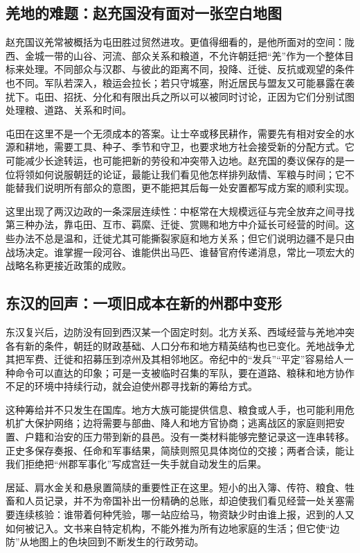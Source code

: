\subsection{羌地的难题：赵充国没有面对一张空白地图}

赵充国议羌常被概括为屯田胜过贸然进攻。更值得细看的，是他所面对的空间：陇西、金城一带的山谷、河流、部众关系和粮道，不允许朝廷把“羌”作为一个整体目标来处理。不同部众与汉郡、与彼此的距离不同，投降、迁徙、反抗或观望的条件也不同。军队若深入，粮运会拉长；若只守城塞，附近居民与盟友又可能暴露在袭扰下。屯田、招抚、分化和有限出兵之所以可以被同时讨论，正因为它们分别试图处理粮、道路、关系和时间。

屯田在这里不是一个无须成本的答案。让士卒或移民耕作，需要先有相对安全的水源和耕地，需要工具、种子、季节和守卫，也要求地方社会接受新的分配方式。它可能减少长途转运，也可能把新的劳役和冲突带入边地。赵充国的奏议保存的是一位将领如何说服朝廷的论证，最能让我们看见他怎样排列敌情、军粮与时间；它不能替我们说明所有部众的意图，更不能把其后每一处安置都写成方案的顺利实现。

这里出现了两汉边政的一条深层连续性：中枢常在大规模远征与完全放弃之间寻找第三种办法，靠屯田、互市、羁縻、迁徙、赏赐和地方中介延长可经营的时间。这些办法不总是温和，迁徙尤其可能撕裂家庭和地方关系；但它们说明边疆不是只由战场决定。谁掌握一段河谷、谁能供出马匹、谁替官府传递消息，常比一项宏大的战略名称更接近政策的成败。

\subsection{东汉的回声：一项旧成本在新的州郡中变形}

东汉复兴后，边防没有回到西汉某一个固定时刻。北方关系、西域经营与羌地冲突各有新的条件，朝廷的财政基础、人口分布和地方精英结构也已变化。羌地战争尤其把军费、迁徙和招募压到凉州及其相邻地区。帝纪中的“发兵”“平定”容易给人一种命令可以直达的印象；可是一支被临时召集的军队，要在道路、粮秣和地方协作不足的环境中持续行动，就会迫使州郡寻找新的筹给方式。

这种筹给并不只发生在国库。地方大族可能提供信息、粮食或人手，也可能利用危机扩大保护网络；边将需要与部曲、降人和地方官协商；逃离战区的家庭则把安置、户籍和治安的压力带到新的县邑。没有一类材料能够完整记录这一连串转移。正史多保存奏报、任命和军事结果，简牍则照见具体岗位的交接；两者合读，能让我们拒绝把“州郡军事化”写成宫廷一失手就自动发生的后果。

居延、肩水金关和悬泉置简牍的重要性正在这里。短小的出入簿、传符、粮食、牲畜和人员记录，并不为帝国补出一份精确的总账，却迫使我们看见经营一处关塞需要连续核验：谁带着何种凭验，哪一站应给马，物资缺少时由谁上报，迟到的人又如何被记入。文书来自特定机构，不能外推为所有边地家庭的生活；但它使“边防”从地图上的色块回到不断发生的行政劳动。

